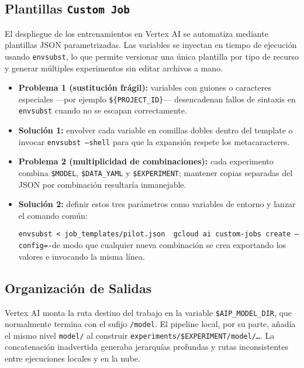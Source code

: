 \subsection{Plantillas \texttt{Custom Job}}\label{ssec:job_templates}

El despliegue de los entrenamientos en Vertex AI se automatiza mediante plantillas JSON parametrizadas.
Las variables se inyectan en tiempo de ejecución usando \texttt{envsubst}, lo que permite versionar una única plantilla por tipo de recurso y generar múltiples experimentos sin editar archivos a mano.

\begin{itemize}
   \item \textbf{Problema 1 (sustitución frágil):} variables con guiones o caracteres especiales —por ejemplo \verb|${PROJECT_ID}|— desencadenan fallos de sintaxis en \texttt{envsubst} cuando no se escapan correctamente.
   \item \textbf{Solución 1:} envolver cada variable en comillas dobles dentro del template o invocar \texttt{envsubst --shell} para que la expansión respete los metacaracteres.
   \item \textbf{Problema 2 (multiplicidad de combinaciones):} cada experimento combina \verb|$MODEL|, \verb|$DATA_YAML| y \verb|$EXPERIMENT|; mantener copias separadas del JSON por combinación resultaría inmanejable.
   \item \textbf{Solución 2:} definir estos tres parámetros como variables de entorno y lanzar el comando común:\par
         \texttt{envsubst < job\_templates/pilot.json \textbar\ gcloud ai custom-jobs create --config=-}\quad de modo que cualquier nueva combinación se crea exportando los valores e invocando la misma línea.
\end{itemize}

\subsection{Organización de Salidas}\label{ssec:dirs}

Vertex AI monta la ruta destino del trabajo en la variable \verb|$AIP_MODEL_DIR|, que normalmente termina con el sufijo \texttt{/model}.
El pipeline local, por su parte, añadía el mismo nivel \texttt{model/} al construir \texttt{experiments/\$EXPERIMENT/model/…}.
La concatenación inadvertida generaba jerarquías profundas y rutas inconsistentes entre ejecuciones locales y en la nube.

